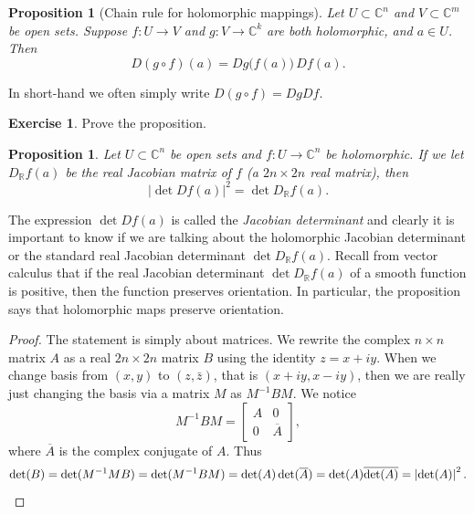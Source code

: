\documentclass[12pt,openany]{book}
\newcommand{\abs}[1]{\left\lvert {#1} \right\rvert}
\newcommand{\C}{{\mathbb{C}}}
\newcommand{\R}{{\mathbb{R}}}
\newcommand{\myindex}[1]{#1\index{#1}}
\theoremstyle{plain}
\newtheorem{prop}[thm]{Proposition}
\theoremstyle{remark}
\theoremstyle{definition}
\newenvironment{exbox}{%
    \def\FrameCommand{\vrule width 1pt \relax\hspace {10pt}}%
    \MakeFramed {\advance \hsize -\width \FrameRestore }%
}{%
    \endMakeFramed
}
\theoremstyle{exercise}
\newtheorem{exercise}{Exercise}[section]
\theoremstyle{example}
\begin{document}
\begin{prop}[Chain rule for holomorphic mappings]
Let $U \subset \C^n$ and $V \subset \C^m$ be open sets.  Suppose
$f \colon U \to V$ and $g \colon V \to \C^k$ are both holomorphic,
and $a \in U$.  Then
\begin{equation*}
D(g \circ f)(a) = Dg\bigl(f(a)\bigr) \, Df(a) .
\end{equation*}
\end{prop}

In short-hand we often simply write $D(g \circ f) = Dg Df$.

\begin{exbox}
\begin{exercise}
Prove the proposition.
\end{exercise}
\end{exbox}

\begin{prop}
Let $U \subset \C^n$ be open sets and 
$f \colon U \to \C^n$ be holomorphic.
%
If we let $D_\R f (a)$ be the real
Jacobian matrix of $f$ (a $2n \times 2n$ real matrix), then
\begin{equation*}
\abs{\det D f(a) }^2 = 
\det D_\R f(a) .
\end{equation*}
\end{prop}

The expression $\det D f(a)$ is called the \emph{\myindex{Jacobian
determinant}} and clearly it is important to know if we are talking about
the holomorphic Jacobian determinant or the standard real Jacobian
determinant $\det D_\R f(a)$.  Recall from vector calculus that
if the real Jacobian determinant $\det D_\R
f(a)$ of a smooth function is positive, then the function preserves
orientation.  In particular, the proposition
says that holomorphic maps preserve orientation.

\begin{proof}
The statement is simply about matrices.
We rewrite the complex $n \times n$
matrix $A$ as a real $2n \times 2n$ matrix $B$ using the
identity $z=x+iy$.
When we change basis from $(x,y)$ to $(z,\bar{z})$,
that is
$(x+iy,x-iy)$, then we are really just changing the basis via a matrix $M$ as
$M^{-1} B M$.  We notice
\begin{equation*}
M^{-1} B M =
\begin{bmatrix}
A & 0 \\
0 & \overline{A}
\end{bmatrix} ,
\end{equation*}
where $\overline{A}$ is the complex conjugate of $A$.  Thus
\begin{equation*}
\det (B) =
\det(M^{-1}M B)
=
\det(M^{-1} B M)
=
\det(A) \det(\overline{A})
=
\det(A) \overline{\det(A)}
=
\abs{\det(A)}^2 . \qedhere
\end{equation*}
\end{proof}
\end{document}
